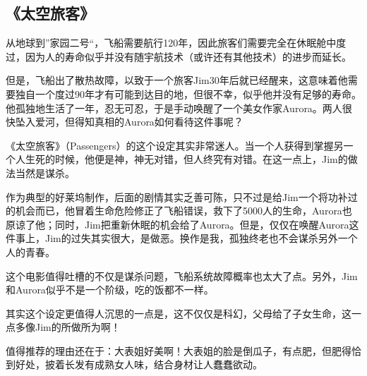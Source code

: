 \subsection{《太空旅客》}
从地球到”家园二号“，飞船需要航行120年，因此旅客们需要完全在休眠舱中度过，因为人的寿命似乎并没有随宇航技术（或许还有其他技术）的进步而延长。
 
但是，飞船出了散热故障，以致于一个旅客Jim30年后就已经醒来，这意味着他需要独自一个度过90年才有可能到达目的地，但很不幸，似乎他并没有足够的寿命。他孤独地生活了一年，忍无可忍，于是手动唤醒了一个美女作家Aurora。两人很快坠入爱河，但得知真相的Aurora如何看待这件事呢？ 

《太空旅客》（Passengers）的这个设定其实非常迷人。当一个人获得到掌握另一个人生死的时候，他便是神，神无对错，但人终究有对错。在这一点上，Jim的做法当然是谋杀。 

作为典型的好莱坞制作，后面的剧情其实乏善可陈，只不过是给Jim一个将功补过的机会而已，他冒着生命危险修正了飞船错误，救下了5000人的生命，Aurora也原谅了他；同时，Jim把重新休眠的机会给了Aurora。但是，仅仅在唤醒Aurora这件事上，Jim的过失其实很大，是做恶。换作是我，孤独终老也不会谋杀另外一个人的青春。 

这个电影值得吐槽的不仅是谋杀问题，飞船系统故障概率也太大了点。另外，Jim和Aurora似乎不是一个阶级，吃的饭都不一样。
 
其实这个设定更值得人沉思的一点是，这不仅仅是科幻，父母给了子女生命，这一点多像Jim的所做所为啊！
 
值得推荐的理由还在于：大表姐好美啊！大表姐的脸是倒瓜子，有点肥，但肥得恰到好处，披着长发有成熟女人味，结合身材让人蠢蠢欲动。